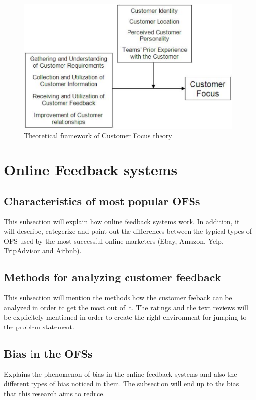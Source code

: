 \begin{figure}[t!]
	\centering
	\includegraphics[height=0.3\textheight]{fig01/CustomerFocus}
	\caption{Theoretical framework of Customer Focus theory}
	\label{fig:CustomerFocus}
\end{figure}

\section{Online Feedback systems}
\label{sec:OFS}
\subsection{Characteristics of most popular OFSs}
\label{subsec:popularOFS}

This subsection will explain how online feedback systems work. In addition, it will describe, categorize and point out the differences between the typical types of OFS used by the most successful online marketers (Ebay, Amazon, Yelp, TripAdvisor and Airbnb). 

\subsection{Methods for analyzing customer feedback}
\label{subsec:feedbackmethods}
This subsection will mention the methods how the customer feeback can be analyzed in order to get the most out of it. The ratings and the text reviews will be explicitely mentioned in order to create the right environment for jumping to the problem statement.

\subsection{Bias in the OFSs}
\label{subsec:bias}
Explains the phenomenon of bias in the online feedback systems and also the different types of bias noticed in them. The subsection will end up to the bias that this research aims to reduce.

